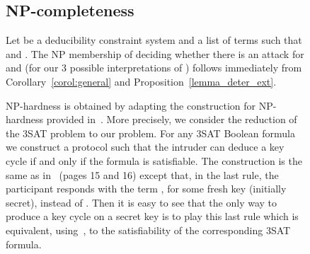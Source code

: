 \documentclass[acmtocl,acmnow]{acmtrans2m}
\newcommand{\comment}[1]{}
\newcommand{\simple}{partial}
\newcommand{\dedsys}[1]{deducibility constraint system}
\newcommand{\dedsyss}[1]{deducibility constraint systems}
\begin{document}
\begin{figure}[t]
{{\comment{ We can have the following possibilities in :
\begin{itemize}
\item[-]  encrypts . Then  is an arc in the graph .
\item[-]  encrypts .
\item[-]  encrypts  or  encrypts . Since , thus , it follows that
there is constraint  in . Hence . We can either that  is a deducible key, and in
this case  is not a part on an encryption cycle (at least
we are not interested in those encryption cycles), either 
is not a key, and in this case  cannot encrypt (by our
definition -- no compound keys) other terms.
\end{itemize}
}


\subsection{NP-completeness} Let  be a \dedsys{} and  a list of terms such that
 and .
The NP membership of deciding whether there is an attack for  and 
(for our 3 possible interpretations of ) follows immediately from Corollary~\ref{corol:general}
and Proposition~\ref{lemma_deter_ext}.





\comment{
Testing for key cycles or for conformance to an order of the encrypts
relation is done in Proposition~\ref{lemma_deter_ext} for keys that are not deducible from . If one
of the keys  in  is deducible, that is there is a {\simple} solution  of  such that
, then we can simply construct a key cycle .

We deduce by combining Theorem~\ref{theo:general} and
Proposition~\ref{lemma_deter_ext} that the problem of deciding
 on arbitrary \dedsyss{} is in NP.
}

NP-hardness is obtained by adapting the construction for NP-hardness provided
in~\cite{RT03TCS}. More precisely, we consider the reduction of the 3SAT problem to our problem. For any 3SAT Boolean formula
we construct a protocol such that the intruder can deduce a key cycle if and only if the formula is
satisfiable. The construction is the same as in~\cite{RT03TCS} (pages 15 and 16) except that, in the last
rule, the participant responds with the term , for some fresh key  (initially secret), instead
of . Then it is easy to see that the only way to produce a key cycle on a secret key is to play this
last rule which is equivalent, using~\cite{RT03TCS}, to the satisfiability of the corresponding 3SAT
formula.











}}
\end{figure}
\end{document}
